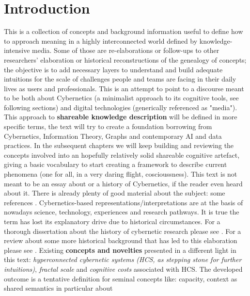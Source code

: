 \documentclass[14pt,a4paper]{extarticle}
\begin{document}
\section*{Introduction}%
\label{sec:intro}%
\hspace*{15mm}This is a collection of concepts and background information useful to define how to approach meaning in a highly interconnected world defined by knowledge-intensive media. Some of those are re-elaborations or follow-ups to other researchers' elaboration or historical reconstructions of the genealogy of concepts; the objective is to add necessary layers to understand and build adequate intuitions for the scale of challenges people and teams are facing in their daily lives as users and professionals.
\newline
\hspace*{15mm}This is an attempt to point to a discourse meant to be both about Cybernetics (a minimalist approach to its cognitive tools, see following sections) and digital technologies (generically referenced as "media"). This approach to \textbf{shareable knowledge description} will be defined in more specific terms, the text will try to create a foundation borrowing from Cybernetics, Information Theory, Graphs and contemporary AI and data practices. In the subsequent chapters we will keep building and reviewing the concepts involved into an hopefully relatively solid shareable cognitive artefact, giving a basic vocabulary to start creating a framework to describe current phenomena (one for all, in a very daring flight, coscioussness).
\newline
\hspace*{15mm}This text is not meant to be an essay about or a history of Cybernetics, if the reader even heard about it. There is already plenty of good material about the subject: some references \cite{ASChistoryrefs,EOLSSvallee,UMPLEBYcybUSA,ROSNAYhistcyb}. Cybernetics-based representations/interpretations are at the basis of nowadays science, technology, experiences and research pathways. It is true the term has lost its explanatory drive due to historical circumstances. For a thorough dissertation about the history of cybernetic research please see \cite{DUPUYmechanization}. For a review about some more historical background that has led to this elaboration please see \cite{heims1980john}. Existing \textbf{concepts and novelties} presented in a different light in this text: \textit{hyperconnected cybernetic systems (HCS, as stepping stone for further intuitions)}, \textit{fractal scale} and \textit{cognitive costs} associated with HCS. The developed outcome is a tentative definition for seminal concepts like: capacity, context as shared semantics in particular about
\end{document}
